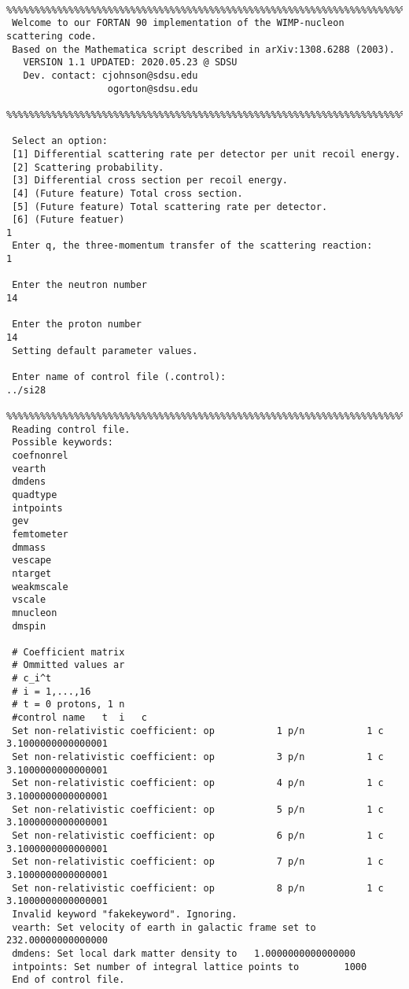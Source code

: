 \documentclass[11pt]{amsart}
\begin{document}
\begin{verbatim}
 %%%%%%%%%%%%%%%%%%%%%%%%%%%%%%%%%%%%%%%%%%%%%%%%%%%%%%%%%%%%%%%%%%%%%%%%%%%%%%%
 Welcome to our FORTAN 90 implementation of the WIMP-nucleon scattering code.
 Based on the Mathematica script described in arXiv:1308.6288 (2003).
   VERSION 1.1 UPDATED: 2020.05.23 @ SDSU
   Dev. contact: cjohnson@sdsu.edu
                  ogorton@sdsu.edu
 %%%%%%%%%%%%%%%%%%%%%%%%%%%%%%%%%%%%%%%%%%%%%%%%%%%%%%%%%%%%%%%%%%%%%%%%%%%%%%%
 
 Select an option:
 [1] Differential scattering rate per detector per unit recoil energy.
 [2] Scattering probability.
 [3] Differential cross section per recoil energy.
 [4] (Future feature) Total cross section.
 [5] (Future feature) Total scattering rate per detector.
 [6] (Future featuer) 
1
 Enter q, the three-momentum transfer of the scattering reaction:
1
  
 Enter the neutron number 
14
  
 Enter the proton number 
14
 Setting default parameter values.
  
 Enter name of control file (.control):
../si28
 %%%%%%%%%%%%%%%%%%%%%%%%%%%%%%%%%%%%%%%%%%%%%%%%%%%%%%%%%%%%%%%%%%%%%%%%%%%%%%%
 Reading control file.
 Possible keywords:
 coefnonrel          
 vearth              
 dmdens              
 quadtype            
 intpoints           
 gev                 
 femtometer          
 dmmass              
 vescape             
 ntarget             
 weakmscale          
 vscale              
 mnucleon            
 dmspin              
 
 # Coefficient matrix
 # Ommitted values ar
 # c_i^t             
 # i = 1,...,16      
 # t = 0 protons, 1 n
 #control name	 t	i	c
 Set non-relativistic coefficient: op           1 p/n           1 c   3.1000000000000001     
 Set non-relativistic coefficient: op           3 p/n           1 c   3.1000000000000001     
 Set non-relativistic coefficient: op           4 p/n           1 c   3.1000000000000001     
 Set non-relativistic coefficient: op           5 p/n           1 c   3.1000000000000001     
 Set non-relativistic coefficient: op           6 p/n           1 c   3.1000000000000001     
 Set non-relativistic coefficient: op           7 p/n           1 c   3.1000000000000001     
 Set non-relativistic coefficient: op           8 p/n           1 c   3.1000000000000001     
 Invalid keyword "fakekeyword". Ignoring.
 vearth: Set velocity of earth in galactic frame set to   232.00000000000000     
 dmdens: Set local dark matter density to   1.0000000000000000     
 intpoints: Set number of integral lattice points to        1000
 End of control file.
 

\end{verbatim}
\end{document}
